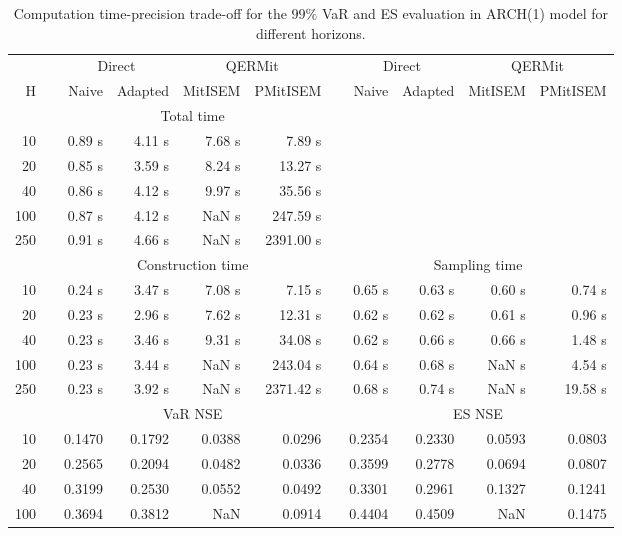 { \renewcommand{\arraystretch}{1.3} 
\begin{table}[h] 
\centering 
\caption{Computation time-precision trade-off for the  $99\%$ VaR and ES evaluation in ARCH(1) model for different horizons.} 
\label{tab:time_precision_arch} 
\begin{tabular}{rr rrrr r rrrr}  
 & & \multicolumn{2}{c}{Direct} & \multicolumn{2}{c}{QERMit}&  & \multicolumn{2}{c}{Direct} & \multicolumn{2}{c}{QERMit} \\ \cline{3-6} \cline{8-11} 
 H & & Naive & Adapted & MitISEM & PMitISEM & & Naive & Adapted & MitISEM & PMitISEM \\ \hline 
 & & \multicolumn{4}{c}{Total time}  \\ \cline{3-6} 
10 & & 0.89 s & 4.11 s & 7.68 s & 7.89 s \\ 
20 & & 0.85 s & 3.59 s & 8.24 s & 13.27 s \\ 
40 & & 0.86 s & 4.12 s & 9.97 s & 35.56 s \\ 
100 & & 0.87 s & 4.12 s &  NaN s & 247.59 s \\ 
250 & & 0.91 s & 4.66 s &  NaN s & 2391.00 s \\ 
\hline 
 & & \multicolumn{4}{c}{Construction time} & & \multicolumn{4}{c}{ Sampling time} \\ \cline{3-6}  \cline{8-11}
10 & & 0.24 s & 3.47 s & 7.08 s & 7.15 s && 0.65 s & 0.63 s & 0.60 s & 0.74 s \\ 
20 & & 0.23 s & 2.96 s & 7.62 s & 12.31 s && 0.62 s & 0.62 s & 0.61 s & 0.96 s \\ 
40 & & 0.23 s & 3.46 s & 9.31 s & 34.08 s && 0.62 s & 0.66 s & 0.66 s & 1.48 s \\ 
100 & & 0.23 s & 3.44 s &  NaN s & 243.04 s && 0.64 s & 0.68 s &  NaN s & 4.54 s \\ 
250 & & 0.23 s & 3.92 s &  NaN s & 2371.42 s && 0.68 s & 0.74 s &  NaN s & 19.58 s \\ 
\hline 
 & & \multicolumn{4}{c}{VaR NSE} &&  \multicolumn{4}{c}{ES NSE} \\ \cline{3-6}  \cline{8-11}
10 && 0.1470  & 0.1792  & 0.0388 & 0.0296 && 0.2354  & 0.2330  & 0.0593 & 0.0803 \\ 
20 && 0.2565  & 0.2094  & 0.0482 & 0.0336 && 0.3599  & 0.2778  & 0.0694 & 0.0807 \\ 
40 && 0.3199  & 0.2530  & 0.0552 & 0.0492 && 0.3301  & 0.2961  & 0.1327 & 0.1241 \\ 
100 && 0.3694  & 0.3812  &    NaN & 0.0914 && 0.4404  & 0.4509  &    NaN & 0.1475 \\ 

\end{tabular}
\end{table}}
